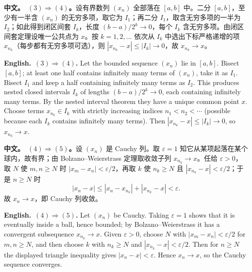 \documentclass[UTF8,11pt,a4paper]{ctexart}
\newcommand{\BOTH}[2]{\par\noindent\textbf{中文。}\ #1\par\noindent\textbf{English.}\ #2\par}
\begin{document}
\BOTH{\textbf{$(3)\Rightarrow(4)$。}设有界数列 $(x_n)$ 全部落在 $[a,b]$ 中。二分 $[a,b]$，至少有一半含 $(x_n)$ 的无穷多项，取它为 $I_1$；再二分 $I_1$，取含无穷多项的一半为 $I_2$；如此得到闭区间套 $I_k$，长度 $(b-a)/2^{k}\to0$，每个 $I_k$ 含无穷多项。由闭区间套定理设唯一公共点为 $x$。按 $k=1,2,\dots$ 依次从 $I_k$ 中选出下标严格递增的项 $x_{n_k}$（每步都有无穷多项可选），则 $|x_{n_k}-x|\le|I_k|\to0$，故 $x_{n_k}\to x$。}{\textbf{$(3)\Rightarrow(4)$.} Let the bounded sequence $(x_n)$ lie in $[a,b]$. Bisect $[a,b]$; at least one half contains infinitely many terms of $(x_n)$, take it as $I_1$. Bisect $I_1$ and keep a half containing infinitely many terms as $I_2$. This produces nested closed intervals $I_k$ of lengths $(b-a)/2^{k}\to0$, each containing infinitely many terms. By the nested interval theorem they have a unique common point $x$. Choose terms $x_{n_k}\in I_k$ with strictly increasing indices $n_1<n_2<\cdots$ (possible because each $I_k$ contains infinitely many terms). Then $|x_{n_k}-x|\le|I_k|\to0$, so $x_{n_k}\to x$.}
\BOTH{\textbf{$(4)\Rightarrow(5)$。}设 $(x_n)$ 是 Cauchy 列。取 $\varepsilon=1$ 知它从某项起落在某个球内，故有界；由 Bolzano--Weierstrass 定理取收敛子列 $x_{n_k}\to x$。任给 $\varepsilon>0$，取 $N$ 使 $m,n\ge N$ 时 $|x_m-x_n|<\varepsilon/2$，再取 $k$ 使 $n_k\ge N$ 且 $|x_{n_k}-x|<\varepsilon/2$；于是 $n\ge N$ 时
\[
|x_n-x|\le|x_n-x_{n_k}|+|x_{n_k}-x|<\varepsilon .
\]
故 $x_n\to x$，即 Cauchy 列收敛。}{\textbf{$(4)\Rightarrow(5)$.} Let $(x_n)$ be Cauchy. Taking $\varepsilon=1$ shows that it is eventually inside a ball, hence bounded; by Bolzano--Weierstrass it has a convergent subsequence $x_{n_k}\to x$. Given $\varepsilon>0$, choose $N$ with $|x_m-x_n|<\varepsilon/2$ for $m,n\ge N$, and then choose $k$ with $n_k\ge N$ and $|x_{n_k}-x|<\varepsilon/2$. Then for $n\ge N$ the displayed triangle inequality gives $|x_n-x|<\varepsilon$. Hence $x_n\to x$, so the Cauchy sequence converges.}
\end{document}
